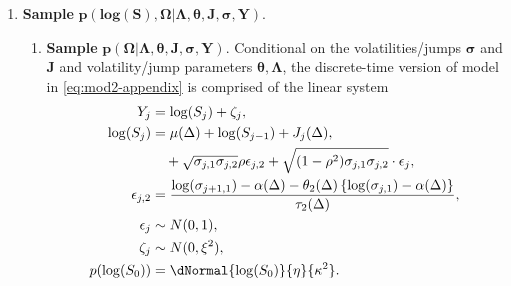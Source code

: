 \begin{enumerate}
\item \textbf{Sample} $\boldsymbol{p(\mbox{log} (S), \Omega |\Lambda, \theta, J, \sigma, Y)}.$ 
  \begin{enumerate}
  \item \textbf{Sample} $\boldsymbol{p(\Omega| \Lambda, \theta, J, \sigma, Y)}.$ Conditional on the volatilities/jumps $\boldsymbol{\sigma}$ and $\boldsymbol{J}$ and volatility/jump parameters $\boldsymbol{\theta}, \boldsymbol{\Lambda}$, the discrete-time version of model in \eqref{eq:mod2-appendix} is comprised of the linear system
    \begin{align}
      \label{eq:step1a}
      \begin{split}
        Y_j &= \log(S_j) + \zeta_j, \\
        \log(S_{j}) &= \mu(\Delta) + \log(S_{j-1}) +  J_j(\Delta), \\
        &\quad + \sqrt{\sigma_{j,1}\sigma_{j,2}}\rho\epsilon_{j,2} +  \sqrt{(1-\rho^2) \sigma_{j,1}\sigma_{j,2}}\cdot\epsilon_{j}, \\
        \epsilon_{j,2} &= \frac{\log(\sigma_{j+1,1}) - \alpha(\Delta) - \theta_2(\Delta)\left\{\log(\sigma_{j,1})-\alpha(\Delta)\right\}}{\tau_2(\Delta)}, \\
        \epsilon_{j} &\sim N(0,1),  \\
        \zeta_j &\sim N(0,\xi^2), \\
      p(\log(S_0)) &= \dNormal{\log(S_0)}{\eta}{\kappa^2}.
      \end{split}
    \end{align}
    

\end{enumerate}
\end{enumerate}
